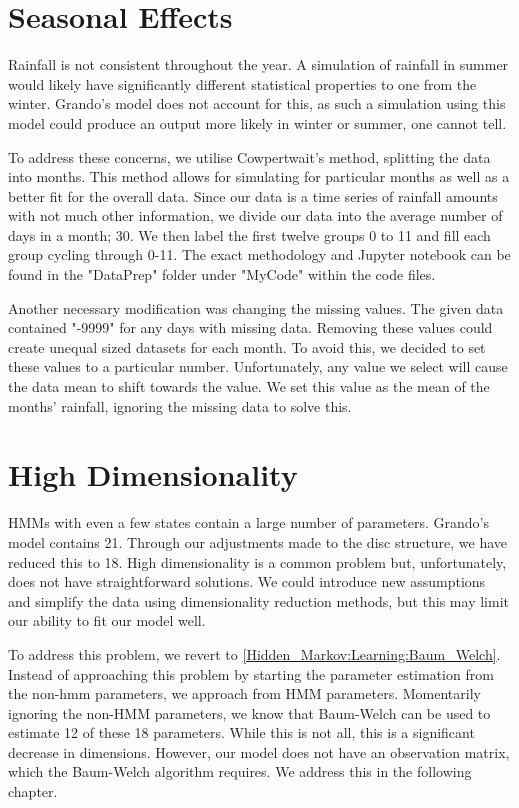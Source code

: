 \section{Seasonal Effects}
\label{Extending_HMM_Based_Rainfall_Models:Seasonal_Effects}

Rainfall is not consistent throughout the year. A simulation of rainfall in summer would likely have significantly different statistical properties to one from the winter. Grando's model does not account for this, as such a simulation using this model could produce an output more likely in winter or summer, one cannot tell. 

To address these concerns, we utilise Cowpertwait's method, splitting the data into months. This method allows for simulating for particular months as well as a better fit for the overall data. Since our data is a time series of rainfall amounts with not much other information, we divide our data into the average number of days in a month; 30. We then label the first twelve groups 0 to 11 and fill each group cycling through 0-11. The exact methodology and Jupyter notebook can be found in the "DataPrep" folder under "MyCode" within the code files. 

Another necessary modification was changing the missing values. The given data contained "-9999" for any days with missing data. Removing these values could create unequal sized datasets for each month. To avoid this, we decided to set these values to a particular number. Unfortunately, any value we select will cause the data mean to shift towards the value. We set this value as the mean of the months' rainfall, ignoring the missing data to solve this. 

\section{High Dimensionality}
\label{Extending_HMM_Based_Rainfall_Models:High_Dimensionality}


HMMs with even a few states contain a large number of parameters. Grando's model contains 21. Through our adjustments made to the disc structure, we have reduced this to 18. High dimensionality is a common problem but, unfortunately, does not have straightforward solutions. We could introduce new assumptions and simplify the data using dimensionality reduction methods, but this may limit our ability to fit our model well. 

To address this problem, we revert to \ref{Hidden_Markov:Learning:Baum_Welch}. Instead of approaching this problem by starting the parameter estimation from the non-hmm parameters, we approach from HMM parameters. Momentarily ignoring the non-HMM parameters, we know that Baum-Welch can be used to estimate 12 of these 18 parameters. While this is not all, this is a significant decrease in dimensions. However, our model does not have an observation matrix, which the Baum-Welch algorithm requires. We address this in the following chapter.
